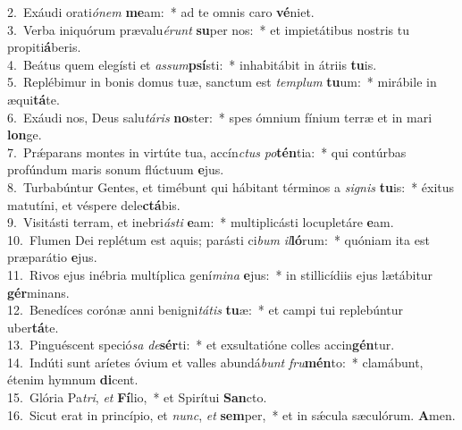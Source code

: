 {2.~}Exáudi orati\textit{ó}\textit{nem} \textbf{me}am:~* ad te omnis caro \textbf{vé}niet.\\
{3.~}Verba iniquórum prævalu\textit{é}\textit{runt} \textbf{su}per nos:~* et impietátibus nostris tu propiti\textbf{á}beris.\\
{4.~}Beátus quem elegísti et \textit{as}\textit{sum}\textbf{psí}sti:~* inhabitábit in átriis \textbf{tu}is.\\
{5.~}Replébimur in bonis domus tuæ, sanctum est \textit{tem}\textit{plum} \textbf{tu}um:~* mirábile in æqui\textbf{tá}te.\\
{6.~}Exáudi nos, Deus salu\textit{tá}\textit{ris} \textbf{no}ster:~* spes ómnium fínium terræ et in mari \textbf{lon}ge.\\
{7.~}Prǽparans montes in virtúte tua, accín\textit{ctus} \textit{po}\textbf{tén}tia:~* qui contúrbas profúndum maris sonum flúctuum \textbf{e}jus.\\
{8.~}Turbabúntur Gentes, et timébunt qui hábitant términos a \textit{si}\textit{gnis} \textbf{tu}is:~* éxitus matutíni, et véspere dele\textbf{ctá}bis.\\
{9.~}Visitásti terram, et inebri\textit{á}\textit{sti} \textbf{e}am:~* multiplicásti locupletáre \textbf{e}am.\\
{10.~}Flumen Dei replétum est aquis; parásti ci\textit{bum} \textit{il}\textbf{ló}rum:~* quóniam ita est præparátio \textbf{e}jus.\\
{11.~}Rivos ejus inébria multíplica gení\textit{mi}\textit{na} \textbf{e}jus:~* in stillicídiis ejus lætábitur \textbf{gér}minans.\\
{12.~}Benedíces corónæ anni benigni\textit{tá}\textit{tis} \textbf{tu}æ:~* et campi tui replebúntur uber\textbf{tá}te.\\
{13.~}Pinguéscent speció\textit{sa} \textit{de}\textbf{sér}ti:~* et exsultatióne colles accin\textbf{gén}tur.\\
{14.~}Indúti sunt aríetes óvium et valles abundá\textit{bunt} \textit{fru}\textbf{mén}to:~* clamábunt, étenim hymnum \textbf{di}cent.\\
{15.~}Glória Pa\textit{tri}, \textit{et} \textbf{Fí}lio,~* et Spirítui \textbf{San}cto.\\
{16.~}Sicut erat in princípio, et \textit{nunc}, \textit{et} \textbf{sem}per,~* et in sǽcula sæculórum. \textbf{A}men.\\
